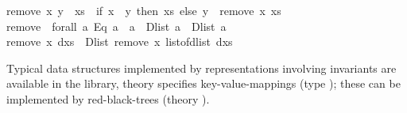 \begin{isabellebody}
\begin{isamarkuptext}
remove{}\ x\ {}y\ {}\ xs{}\ {}\ {}if\ x\ {}{}\ y\ then\ xs\ else\ y\ {}\ remove{}\ x\ xs{}{}\isanewline
\isanewline
remove\ {}{}\ forall\ a{}\ {}Eq\ a{}\ {}{}\ a\ {}{}\ Dlist\ a\ {}{}\ Dlist\ a{}\isanewline
remove\ x\ dxs\ {}\ Dlist\ {}remove{}\ x\ {}list{}of{}dlist\ dxs{}{}{}\isanewline
\isanewline
{}\isanewline%
\end{isamarkuptext}%
\isamarkuptrue%
%
\endisatagquotetypewriter
{\isafoldquotetypewriter}%
%
\isadelimquotetypewriter
%
\endisadelimquotetypewriter
%
\begin{isamarkuptext}%
Typical data structures implemented by representations involving
  invariants are available in the library, theory 
  specifies key-value-mappings (type );
  these can be implemented by red-black-trees (theory ).%
\end{isamarkuptext}%
\isamarkuptrue%
%
\isadelimtheory
%
\endisadelimtheory
%
\isatagtheory
{}\isamarkupfalse%
%
\endisatagtheory
{\isafoldtheory}%
%
\isadelimtheory
%
\endisadelimtheory
\isanewline
\isanewline
\end{isabellebody}%
